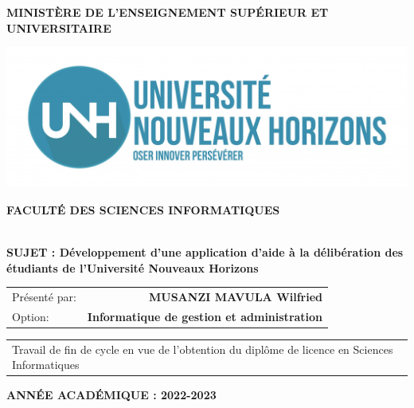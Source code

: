 \thispagestyle{empty}

\begin{center}
	\textbf{\large MINISTÈRE DE L'ENSEIGNEMENT SUPÉRIEUR ET UNIVERSITAIRE}
\end{center}

\begin{center}
    \includegraphics[scale=0.20]{gfx/logo-white}
\end{center}

\begin{center}
	\textbf{\large FACULTÉ DES SCIENCES INFORMATIQUES}
\end{center}

\vspace{2cm}
\begin{center}
	\hrulefill  \\
	\large{
		\textbf{
			SUJET : Développement d’une application d’aide à la délibération des étudiants de
            l’Université Nouveaux Horizons
		}
	} \\
	\hrulefill
\end{center}

\vspace{0.5cm}
\hfill
\begin{tabular}{lr}
	Présenté par: & \textbf{MUSANZI MAVULA Wilfried} \\
	Option: & \textbf{Informatique de gestion et administration} \\
\end{tabular}

\vspace{0.5cm}
\hfill
\begin{tabular}{p{9.5cm}}
	Travail de fin de cycle en vue de l'obtention du diplôme de licence en Sciences Informatiques
\end{tabular}

\vfill
\begin{center}
	\large{
		\textbf{
			ANNÉE ACADÉMIQUE : 2022-2023
		}
	}
\end{center}

